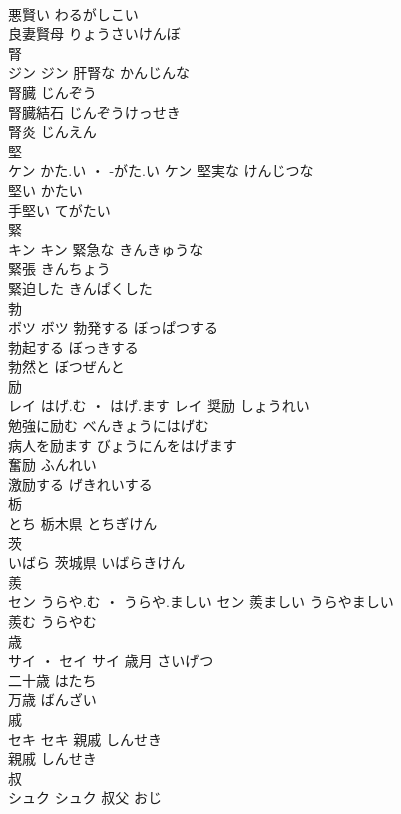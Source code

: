 \documentclass[8pt]{extreport}
\begin{document}
\begin{CJK}{UTF8}{min}
\\	悪賢い	わるがしこい	
\\	良妻賢母	りょうさいけんぼ	
\\	腎	
\\	ジン		ジン	肝腎な	かんじんな	
\\	腎臓	じんぞう	
\\	腎臓結石	じんぞうけっせき	
\\	腎炎	じんえん	
\\	堅	
\\	ケン	かた.い ・ -がた.い	ケン	堅実な	けんじつな	
\\	堅い	かたい	
\\	手堅い	てがたい	
\\	緊	
\\	キン		キン	緊急な	きんきゅうな	
\\	緊張	きんちょう	
\\	緊迫した	きんぱくした	
\\	勃	
\\	ボツ		ボツ	勃発する	ぼっぱつする	
\\	勃起する	ぼっきする	
\\	勃然と	ぼつぜんと	
\\	励	
\\	レイ	はげ.む ・ はげ.ます	レイ	奨励	しょうれい	
\\	勉強に励む	べんきょうにはげむ	
\\	病人を励ます	びょうにんをはげます	
\\	奮励	ふんれい	
\\	激励する	げきれいする	
\\	栃	
\\	とち														栃木県	とちぎけん	
\\	茨	
\\	いばら														茨城県	いばらきけん	
\\	羨	
\\	セン	うらや.む ・ うらや.ましい	セン	羨ましい	うらやましい	
\\	羨む	うらやむ	
\\	歳	
\\	サイ ・ セイ		サイ	歳月	さいげつ	
\\	二十歳	はたち	
\\	万歳	ばんざい	
\\	戚	
\\	セキ		セキ	親戚	しんせき	
\\	親戚	しんせき	
\\	叔	
\\	シュク		シュク	叔父	おじ	

\end{CJK}
\end{document}
